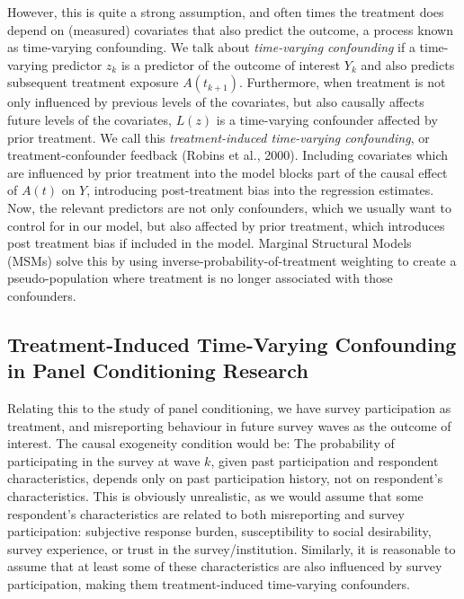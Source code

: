 \documentclass[
  letterpaper,
  DIV=11,
  numbers=noendperiod]{scrartcl}
\begin{document}
However, this is quite a strong assumption, and often times the
treatment does depend on (measured) covariates that also predict the
outcome, a process known as time-varying confounding. We talk about
\emph{time-varying confounding} if a time-varying predictor \(z_k\) is a
predictor of the outcome of interest \(Y_k\) and also predicts
subsequent treatment exposure \(A(t_{k+1})\). Furthermore, when
treatment is not only influenced by previous levels of the covariates,
but also causally affects future levels of the covariates, \(L(z)\) is a
time-varying confounder affected by prior treatment. We call this
\emph{treatment-induced time-varying confounding}, or
treatment-confounder feedback (Robins et al., 2000). Including
covariates which are influenced by prior treatment into the model blocks
part of the causal effect of \(A(t)\) on \(Y\), introducing
post-treatment bias into the regression estimates. Now, the relevant
predictors are not only confounders, which we usually want to control
for in our model, but also affected by prior treatment, which introduces
post treatment bias if included in the model. Marginal Structural Models
(MSMs) solve this by using inverse-probability-of-treatment weighting to
create a pseudo-population where treatment is no longer associated with
those confounders.

\subsection{Treatment-Induced Time-Varying Confounding in Panel
Conditioning
Research}\label{treatment-induced-time-varying-confounding-in-panel-conditioning-research}

Relating this to the study of panel conditioning, we have survey
participation as treatment, and misreporting behaviour in future survey
waves as the outcome of interest. The causal exogeneity condition would
be: The probability of participating in the survey at wave \(k\), given
past participation and respondent characteristics, depends only on past
participation history, not on respondent's characteristics. This is
obviously unrealistic, as we would assume that some respondent's
characteristics are related to both misreporting and survey
participation: subjective response burden, susceptibility to social
desirability, survey experience, or trust in the survey/institution.
Similarly, it is reasonable to assume that at least some of these
characteristics are also influenced by survey participation, making them
treatment-induced time-varying confounders.
\end{document}
